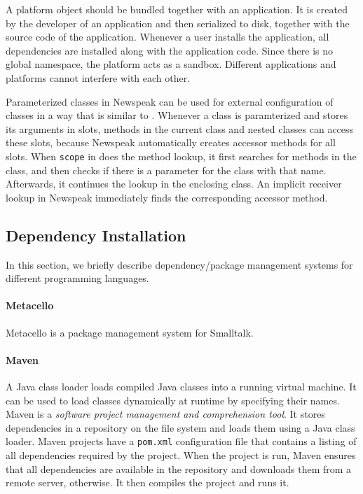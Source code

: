 A platform object should be bundled together with an application. It is created by the developer of an application and then serialized to disk, together with the source code of the application. Whenever a user installs the application, all dependencies are installed along with the application code. Since there is no global namespace, the platform acts as a sandbox. Different applications and platforms cannot interfere with each other.

Parameterized classes in Newspeak can be used for external configuration of classes in a way that is similar to \msname. Whenever a class is paramterized and stores its arguments in slots, methods in the current class and nested classes can access these slots, because Newspeak automatically creates accessor methods for all slots. When \texttt{scope} in \msname does the method lookup, it first searches for methods in the class, and then checks if there is a parameter for the class with that name. Afterwards, it continues the lookup in the enclosing class. An implicit receiver lookup in Newspeak immediately finds the corresponding accessor method.

\subsection{Dependency Installation}
\label{sec:rel_metacello}
In this section, we briefly describe dependency/package management systems for different programming languages.

\paragraph{Metacello}
Metacello is a package management system for Smalltalk. 

\paragraph{Maven}
A Java class loader loads compiled Java classes into a running virtual machine. It can be used to load classes dynamically at runtime by specifying their names. Maven is a \emph{software project management and comprehension tool}. It stores dependencies in a repository on the file system and loads them using a Java class loader. Maven projects have a \texttt{pom.xml} configuration file that contains a listing of all dependencies required by the project. When the project is run, Maven ensures that all dependencies are available in the repository and downloads them from a remote server, otherwise. It then compiles the project and runs it.

